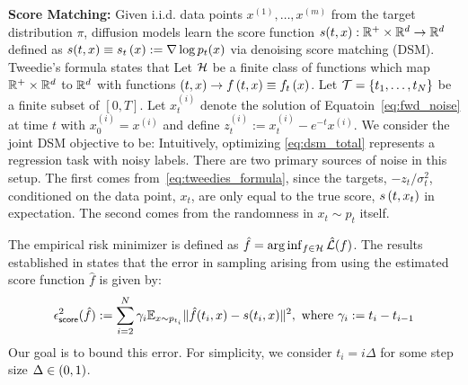 
\textbf{Score Matching:} Given i.i.d. data points $x^{(1)},\dots,x^{(m)}$ from the target distribution $\pi$, diffusion models learn the score function $s(t,x) : \mathbb{R}^{+}\times\mathbb{R}^d \to \mathbb{R}^d$ defined as $s(t,x) \equiv  s_{t}\left(x\right) := \nabla \log p_t(x)$ via denoising score matching (DSM). Tweedie's formula states that  
Let $\mathcal{H}$ be a finite class of functions which map $\mathbb{R}^+\times\mathbb{R}^d$ to $\mathbb{R}^d$ with functions $(t, x) \rightarrow f\left(t, x\right) \equiv f_{t}\left(x\right)$. Let $\mathcal{T} = \{t_1,\dots,t_N\}$ be a finite subset of $[0,T]$. Let $x_t^{(i)}$ denote the solution of Equatoin~\eqref{eq:fwd_noise} at time $t$ with $x_0^{(i)} = x^{(i)}$ and define $z_t^{(i)} := x_t^{(i)}-e^{-t}x^{(i)}$. We consider the joint DSM objective to be: 
Intuitively, optimizing \eqref{eq:dsm_total} represents a regression task with noisy labels. There are two primary sources of noise in this setup. The first comes from~\eqref{eq:tweedies_formula}, since the targets, $-z_t/\sigma_t^2$, conditioned on the data point, $x_{t}$, are only equal to the true score, $s\left(t, x_{t}\right)$ in expectation. The second comes from the randomness in $x_{t} \sim p_{t}$ itself.

The empirical risk minimizer is defined as $\hat{f} = \arg\inf_{f \in \mathcal{H}}\hat{\mathcal{L}}(f)$. The results established in \cite{benton2024nearly} states that the error in sampling arising from using the estimated score function $\hat{f}$ is given by:
\begin{equation}
\epsilon_{\mathsf{score}}^2(\hat{f}) := \sum_{i=2}^{N}\gamma_i\mathbb{E}_{x \sim p_{t_i}}\|\hat{f}(t_i,x) - s(t_i,x)\|^2, \text{ where } \gamma_i:= t_{i}-t_{i-1} \label{eq:sampling_requirement}
\end{equation}
Our goal is to bound this error. For simplicity, we consider $t_i = i\Delta$ for some step size $\Delta \in \left(0,1\right)$. 
